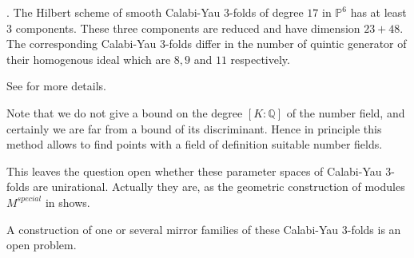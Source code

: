 \documentclass[12pt,leqno]{amsart}
\newcommand{\PP}{{\mathbb P}}
\newcommand{\QQ}{{\mathbb Q}}
\newlength{\ho}
\begin{document}
\begin{theorem}\cite{To}. The Hilbert scheme of smooth Calabi-Yau 3-folds of 
degree $17$ in 
$\PP^6$ has at least 3 components. These three components are reduced  and 
have dimension $23+48$. The corresponding Calabi-Yau 3-folds differ in the
number of quintic generator of their homogenous ideal 
which are $8,9$ and $11$ respectively.   
\end{theorem}

See \cite{To} for more details.
\medskip


Note that we do not give a bound on the degree $[K:\QQ]$ of the number field,
and certainly we are far from a bound of its discriminant.
Hence  in principle this method allows to find points with a field of 
definition suitable number fields.

This leaves the question open whether these parameter spaces of Calabi-Yau 
3-folds are unirational. Actually they are, as the geometric construction
of modules $M^{special}$ in \cite{To} shows.

A construction of one or several mirror families of these Calabi-Yau 3-folds
is an open problem. 
\end{document}
